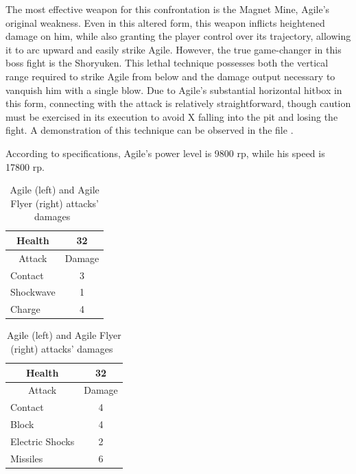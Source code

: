 The most effective weapon for this confrontation is the Magnet Mine, Agile's original weakness. Even in this altered form, this weapon inflicts heightened damage on him, while also granting the player control over its trajectory, allowing it to arc upward and easily strike Agile. However, the true game-changer in this boss fight is the Shoryuken. This lethal technique possesses both the vertical range required to strike Agile from below and the damage output necessary to vanquish him with a single blow. Due to Agile's substantial horizontal hitbox in this form, connecting with the attack is relatively straightforward, though caution must be exercised in its execution to avoid X falling into the pit and losing the fight. A demonstration of this technique can be observed in the file .

According to specifications, Agile's power level is 9800 rp, while his speed is 17800 rp.

\begin{table}[htp]
	\begin{minipage}{.45\linewidth}
		\centering
		\begin{tabular}[h]{l c }
			\toprule
			\multicolumn{1}{c}{Health}  & 32 \\
			\midrule
			\multicolumn{1}{c}{Attack} & \multicolumn{1}{c}{Damage}\\
			Contact & 3\\
			Shockwave& 1\\
			Charge& 4\\
			\bottomrule
		\end{tabular}
	\end{minipage}
	\begin{minipage}{.45\linewidth}
		\centering
		\begin{tabular}[h]{l c }
			\toprule
			\multicolumn{1}{c}{Health}  & 32 \\
			\midrule
			\multicolumn{1}{c}{Attack} & \multicolumn{1}{c}{Damage}\\
			Contact & 4 \\
			Block & 4\\
			Electric Shocks & 2\\
			Missiles& 6\\
			\bottomrule
		\end{tabular}
	\end{minipage}
	\caption{Agile (left) and Agile Flyer (right) attacks' damages~\cite{wiki:Agile,book:Compendium}}
\end{table}

